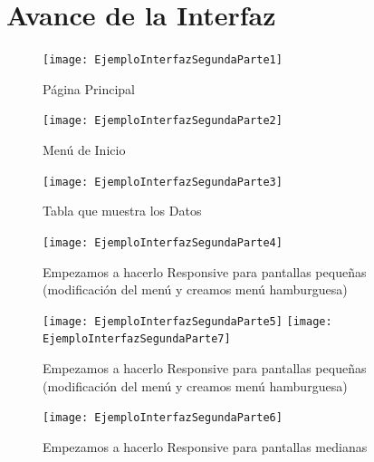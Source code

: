 \documentclass[12pt, fleqn]{report}                             %
\begin{document}
    \clearpage
    \section{Avance de la Interfaz}

        \begin{figure}[ht]
            \centering
            \texttt{[image: EjemploInterfazSegundaParte1]}
            \caption{Página Principal}
        \end{figure}


        \begin{figure}[ht]
            \centering
            \texttt{[image: EjemploInterfazSegundaParte2]}
            \caption{Menú de Inicio}
        \end{figure}

        \begin{figure}[ht]
            \centering
            \texttt{[image: EjemploInterfazSegundaParte3]}
            \caption{Tabla que muestra los Datos}
        \end{figure}

        \begin{figure}[ht]
            \centering
            \texttt{[image: EjemploInterfazSegundaParte4]}
            \caption{Empezamos a hacerlo Responsive para pantallas pequeñas (modificación del menú y creamos menú hamburguesa)}
        \end{figure}

        \begin{figure}[ht]
            \centering
            \texttt{[image: EjemploInterfazSegundaParte5]}
            \texttt{[image: EjemploInterfazSegundaParte7]}
            \caption{Empezamos a hacerlo Responsive para pantallas pequeñas (modificación del menú y creamos menú hamburguesa)}
        \end{figure}


        \begin{figure}[ht]
            \centering
            \texttt{[image: EjemploInterfazSegundaParte6]}
            \caption{Empezamos a hacerlo Responsive para pantallas medianas}
        \end{figure}



    
\end{document}
